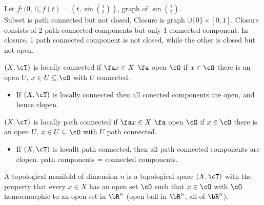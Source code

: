 \begin{example}
    Let $f: (0,1], f(t) = (t, \sin(\frac{1}{t}))$, graph of $\sin (\frac{1}{t})$. \\
    Subset is path connected but not closed. Closure is graph $\cup \{0\} \times [0,1]$. Closure consists of 2 path connected components but only 1 connected component. In closure, 1 path connected component is not closed, while the other is closed but not open.
\end{example}

\begin{definition}
    $(X, \cT)$ is locally connected if $\fa x \in X$ $\fa$ open $\cO$ if $x \in \cO$ there is an open $U$, $x \in U \subseteq \cO$ with $U$ connected. 
\end{definition}

\begin{itemize}
    \item If $(X, \cT)$ is locally connected then all conected components are open, and hence clopen. 
\end{itemize}

\begin{definition}
    $(X, \cT)$ is locally path connected if $\fa x \in X$ $\fa$ open $\cO$ if $x \in \cO$ there is an open $U$, $x \in U \subseteq \cO$ with $U$ path connected. 
\end{definition}

\begin{itemize}
    \item If $(X, \cT)$ is locallt path connected, then all path connected components are clopen. path components = connected components. 
\end{itemize}

\begin{definition}
    A topological manifold of dimension $n$ is a topological space $(X, \cT)$ with the property that every $x \in X$ has an open set $\cO$ such that $x \in \cO$ with $\cO$ homoemorphic to an open set in $\bR^n$ (open ball in $\bR^n$, all of $\bR^n$). 
\end{definition}